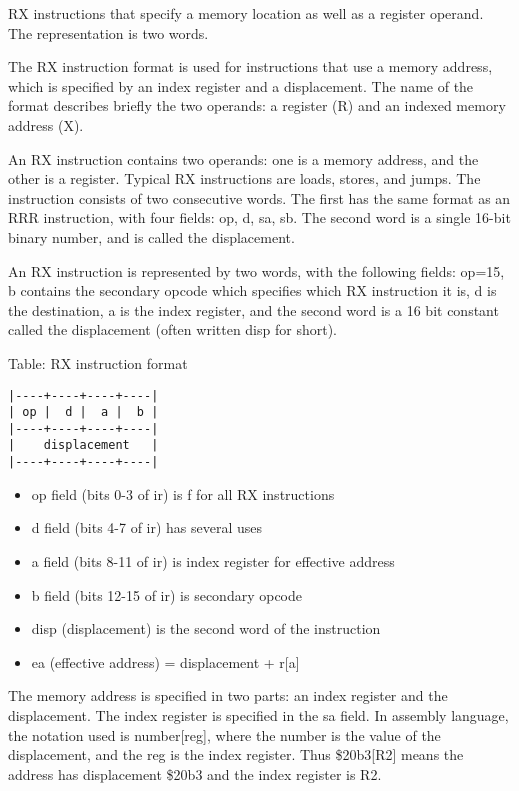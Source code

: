 \documentclass[11pt]{article}
\begin{document}
RX instructions that specify a memory location as well as a
register operand.  The representation is two words.

The RX instruction format is used for instructions that use a memory
address, which is specified by an index register and a displacement.
The name of the format describes briefly the two operands: a register
(R) and an indexed memory address (X).

An RX instruction contains two operands: one is a memory address, and
the other is a register.  Typical RX instructions are loads, stores,
and jumps.  The instruction consists of two consecutive words.  The
first has the same format as an RRR instruction, with four fields: op,
d, sa, sb.  The second word is a single 16-bit binary number, and is
called the displacement.

An RX instruction is represented by two words, with the following
fields: op=15, b contains the secondary opcode which specifies which
RX instruction it is, d is the destination, a is the index register,
and the second word is a 16 bit constant called the displacement
(often written disp for short).

Table: RX instruction format

\begin{verbatim}
|----+----+----+----|
| op |  d |  a |  b |
|----+----+----+----|
|    displacement   |
|----+----+----+----|
\end{verbatim}

\begin{itemize}
\item op field (bits 0-3 of ir) is f for all RX instructions
\item d field (bits 4-7 of ir) has several uses
\item a field (bits 8-11 of ir) is index register for effective address
\item b field (bits 12-15 of ir) is secondary opcode
\item disp (displacement) is the second word of the instruction
\item ea (effective address) = displacement + r[a]
\end{itemize}


The memory address is specified in two parts: an index register and
the displacement.  The index register is specified in the sa field.
In assembly language, the notation used is number[reg], where the
number is the value of the displacement, and the reg is the index
register.  Thus \$20b3[R2] means the address has displacement \$20b3 and
the index register is R2.
\end{document}
